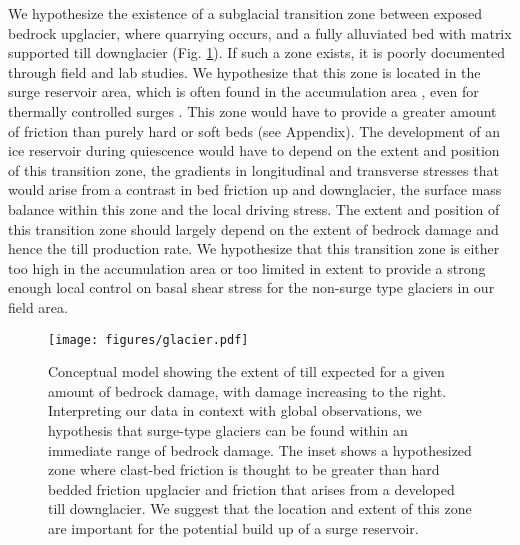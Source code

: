 \documentclass[review]{igs}
\begin{document}
We hypothesize the existence of a subglacial transition zone between exposed bedrock upglacier, where quarrying occurs, and a fully alluviated bed with matrix supported till downglacier (Fig. \ref{gl}). If such a zone exists, it is poorly documented through field and lab studies. We hypothesize that this zone is located in the surge reservoir area, which is often found in the accumulation area \citep[e.g.][]{Kamb1985,Stanley1969}, even for thermally controlled surges \citep[e.g][]{Sevestre2015a,Sund2014}. This zone would have to provide a greater amount of friction than purely hard or soft beds (see Appendix). The development of an ice reservoir during quiescence would have to depend on the extent and position of this transition zone, the gradients in longitudinal and transverse stresses that would arise from a contrast in bed friction up and downglacier, the surface mass balance within this zone and the local driving stress. The extent and position of this transition zone should largely depend on the extent of bedrock damage and hence the till production rate. We hypothesize that this transition zone is either too high in the accumulation area or too limited in extent to provide a strong enough local control on basal shear stress for the non-surge type glaciers in our field area. 

\begin{figure}[H]
  \centering
  \texttt{[image: figures/glacier.pdf]}
  \caption[]{Conceptual model showing the extent of till expected for a given amount of bedrock damage, with damage increasing to the right. Interpreting our data in context with global observations, we hypothesis that surge-type glaciers can be found within an immediate range of bedrock damage. The inset shows a hypothesized zone where clast-bed friction is thought to be greater than hard bedded friction upglacier and friction that arises from a developed till downglacier. We suggest that the location and extent of this zone are important for the potential build up of a surge reservoir. }
\label{gl}
\end{figure}
\end{document}
